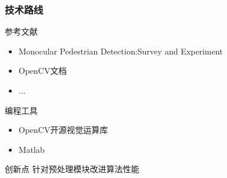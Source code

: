 \documentclass[12pt]{beamer}
\begin{document}
\begin{frame}
\frametitle{技术路线}
\begin{block}{参考文献}
\begin{itemize}
\item Monocular Pedestrian Detection:Survey and Experiment
\item OpenCV文档
\item ...
\end{itemize}
\end{block}
\begin{block}{编程工具}
\begin{itemize}
\item OpenCV开源视觉运算库
\item Matlab
\end{itemize}
\end{block}
\begin{block}{创新点}
针对预处理模块改进算法性能
\end{block}
\end{frame}

\begin{frame}

\end{frame}
\end{document}

